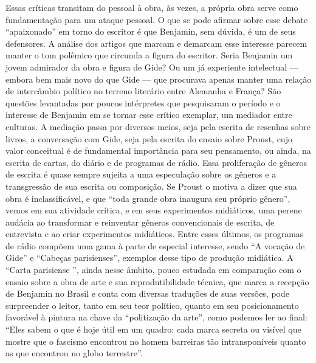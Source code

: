 Essas críticas transitam do pessoal à obra, às vezes, a própria obra
serve como fundamentação para um ataque pessoal. O que se pode afirmar
sobre esse debate ``apaixonado'' em torno do escritor é que Benjamin,
sem dúvida, é um de seus defensores. A análise dos artigos que marcam e
demarcam esse interesse parecem manter o tom polêmico que circunda a
figura do escritor. Seria Benjamin um jovem admirador da obra e figura
de Gide? Ou um já experiente intelectual --- embora bem mais novo do que
Gide --- que procurava apenas manter uma relação de intercâmbio político
no terreno literário entre Alemanha e França? São questões levantadas por poucos
intérpretes que pesquisaram o período e o interesse de Benjamin em se
tornar esse crítico exemplar, um mediador entre culturas. A mediação
passa por diversos meios, seja pela escrita de resenhas sobre livros, a
conversação com Gide, seja pela escrita do ensaio sobre Proust, cujo
valor conceitual é de fundamental importância para seu pensamento, ou
ainda, na escrita de cartas, do diário e de programas de rádio. Essa
proliferação de gêneros de escrita é quase sempre sujeita a uma
especulação sobre os gêneros e a transgressão de sua escrita ou
composição. Se Proust o motiva a dizer que sua obra é inclassificável, e
que ``toda grande obra inaugura seu próprio gênero'', vemos em sua
atividade crítica, e em seus experimentos midiáticos, uma perene audácia
ao transformar e reinventar gêneros convencionais de escrita, de
entrevista e ao criar experimentos midiáticos. Entre esses últimos, os
programas de rádio compõem uma gama à parte de especial interesse, sendo
``A vocação de Gide'' e ``Cabeças parisienses'', exemplos desse tipo de produção midiática. A ``Carta parisiense '', ainda nesse âmbito, pouco estudada em comparação
com o ensaio sobre a obra de arte e sua reprodutibilidade técnica, que
marca a recepção de Benjamin no Brasil e conta com diversas traduções de
suas versões, pode surpreender o leitor, tanto em seu teor político,
quanto em seu posicionamento favorável à pintura na chave da
``politização da arte'', como podemos ler ao final: ``Eles sabem o que é hoje útil
em um quadro: cada marca secreta ou visível que mostre que o fascismo
encontrou no homem barreiras tão intransponíveis quanto as que encontrou no globo
terrestre''.

